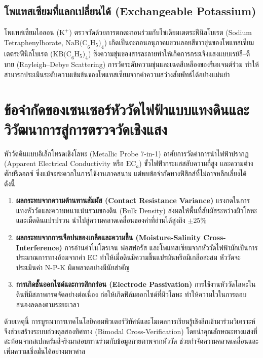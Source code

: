 \subsection{โพแทสเซียมที่แลกเปลี่ยนได้ (Exchangeable Potassium)}
โพแทสเซียมไอออน ($\text{K}^+$) ตรวจวัดด้วยการตกตะกอนร่วมกับโซเดียมเตตระฟีนิลโบเรต (Sodium Tetraphenylborate, $\text{NaB(C}_6\text{H}_5)_4$) เกิดเป็นตะกอนอนุภาคแขวนลอยสีขาวขุ่นของโพแทสเซียมเตตระฟีนิลโบเรต ($\text{KB(C}_6\text{H}_5)_4$) ซึ่งความขุ่นของสารละลายทำให้เกิดการกระเจิงแสงแบบเรย์ลี--ดีบาย (Rayleigh--Debye Scattering) การวัดระดับความขุ่นและเฉดสีเหลืองของรีเอเจนต์ร่วม ทำให้สามารถประเมินระดับความเข้มข้นของโพแทสเซียมจากค่าความสว่างสัมพัทธ์ได้อย่างแม่นยำ

\section{ข้อจำกัดของเซนเซอร์หัววัดไฟฟ้าแบบแทงดินและวิวัฒนาการสู่การตรวจวัดเชิงแสง}

หัววัดดินแบบอิเล็กโทรดเชิงโลหะ (Metallic Probe 7-in-1) อาศัยการวัดค่าการนำไฟฟ้าปรากฏ (Apparent Electrical Conductivity หรือ $\text{EC}_a$) ขั้วไฟฟ้ากระแสสลับความถี่สูง และความต่างศักย์รีดอกซ์ ซึ่งแม้จะสะดวกในการใช้งานภาคสนาม แต่พบข้อจำกัดทางฟิสิกส์ที่ไม่อาจหลีกเลี่ยงได้ ดังนี้

\begin{enumerate}[label=\textbf{\arabic*.}]
\item \textbf{ผลกระทบจากความต้านทานสัมผัส (Contact Resistance Variance)} แรงกดในการแทงหัววัดและความหนาแน่นรวมของดิน (Bulk Density) ส่งผลให้พื้นที่สัมผัสระหว่างผิวโลหะและเม็ดดินแปรปรวน นำไปสู่ความคลาดเคลื่อนของค่าที่อ่านได้สูงถึง $\pm 25\%$
\item \textbf{ผลกระทบจากการเจือปนของเกลือและความชื้น (Moisture-Salinity Cross-Interference)} การอ่านค่าไนโตรเจน ฟอสฟอรัส และโพแทสเซียมจากหัววัดไฟฟ้ามักเป็นการประมาณการทางอ้อมจากค่า $\text{EC}$ ทำให้เมื่อดินมีความชื้นแปรผันหรือมีเกลือสะสม หัววัดจะประเมินค่า N-P-K ผิดพลาดอย่างมีนัยสำคัญ
\item \textbf{การเกิดชั้นออกไซด์และการสึกกร่อน (Electrode Passivation)} การใช้งานหัววัดโลหะในดินที่มีสภาพกรดจัดอย่างต่อเนื่อง ก่อให้เกิดฟิล์มออกไซด์ที่ผิวโลหะ ทำให้ความไวในการตอบสนองลดลงตามระยะเวลา
\end{enumerate}

ด้วยเหตุนี้ การบูรณาการเทคโนโลยีคอมพิวเตอร์วิทัศน์และโมเดลการเรียนรู้เชิงลึกเข้ามาร่วมวิเคราะห์ จึงช่วยสร้างระบบถ่วงดุลสองทิศทาง (Bimodal Cross-Verification) โดยนำคุณลักษณะทางแสงที่สะท้อนจากสเปกตรัมสีจริงมาสอบทานร่วมกับข้อมูลกายภาพจากหัววัด ช่วยกำจัดความคลาดเคลื่อนและเพิ่มความเชื่อมั่นได้อย่างมหาศาล

